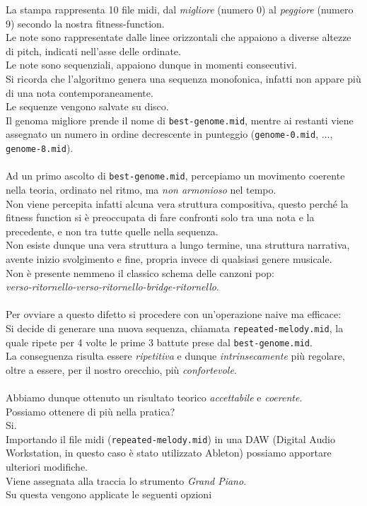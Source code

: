\documentclass[a4paper,12pt]{report}
\begin{document}
La stampa rappresenta 10 file midi, dal \textit{migliore} (numero 0) al \textit{peggiore} (numero 9) secondo la nostra fitness-function. \\
Le note sono rappresentate dalle linee orizzontali che appaiono a diverse altezze di pitch, indicati nell'asse delle ordinate. \\
Le note sono sequenziali, appaiono dunque in momenti consecutivi. \\
Si ricorda che l'algoritmo genera una sequenza monofonica, infatti non appare più di una nota contemporaneamente. \\
Le sequenze vengono salvate su disco. \\
Il genoma migliore prende il nome di \texttt{best-genome.mid}, mentre ai restanti viene assegnato un numero in ordine decrescente in punteggio (\texttt{genome-0.mid}, ..., \texttt{genome-8.mid}). \\
\\
Ad un primo ascolto di \texttt{best-genome.mid}, percepiamo un movimento coerente nella teoria, ordinato nel ritmo, ma \textit{non armonioso} nel tempo. \\
Non viene percepita infatti alcuna vera struttura compositiva, questo perché la fitness function si è preoccupata di fare confronti solo tra una nota e la precedente, e non tra tutte quelle nella sequenza. \\
Non esiste dunque una vera struttura a lungo termine, una struttura narrativa, avente inizio svolgimento e fine, propria invece di qualsiasi genere musicale. \\
Non è presente nemmeno il classico schema delle canzoni pop: \\
\textit{verso-ritornello-verso-ritornello-bridge-ritornello}. \\
\\
Per ovviare a questo difetto si procedere con un'operazione naive ma efficace: \\
Si decide di generare una nuova sequenza, chiamata \texttt{repeated-melody.mid}, la quale ripete per 4 volte le prime 3 battute prese dal \texttt{best-genome.mid}. \\
La conseguenza risulta essere \textit{ripetitiva} e dunque \textit{intrinsecamente} più regolare, oltre a essere, per il nostro orecchio, più \textit{confortevole}. \\
\\
Abbiamo dunque ottenuto un risultato teorico \textit{accettabile} e \textit{coerente}. \\
Possiamo ottenere di più nella pratica? \\
Si. \\
Importando il file midi (\texttt{repeated-melody.mid}) in una DAW (Digital Audio Workstation, in questo caso è stato utilizzato Ableton) possiamo apportare ulteriori modifiche. \\
Viene assegnata alla traccia lo strumento \textit{Grand Piano}. \\
Su questa vengono applicate le seguenti opzioni
\end{document}
